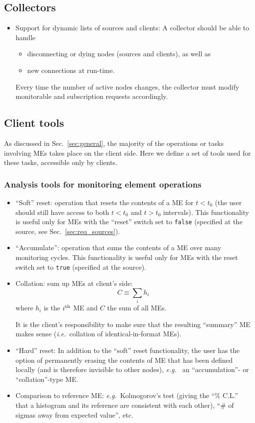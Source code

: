 \documentclass{cmspaper}
\newcommand {\ie}{\mbox{\sl i.e. }}     %
\newcommand {\eg}{\mbox{\sl e.g. }}     %
\begin{document}
\subsection{Collectors}
\label{sec:req_collectors}
\begin{itemize}
\item{Support for dynamic lists of sources and clients: A collector
should be able to handle 
\begin{itemize}
\item{disconnecting or dying nodes (sources and
clients), as well as}
\item{new connections at run-time.}
\end{itemize}
Every time the number of active nodes changes, the collector must
modify monitorable and subscription requests accordingly.}
\end{itemize}
%
%
\subsection{Client tools}
\label{sec:tools}
%
As discussed in Sec.~\ref{sec:general}, the majority of the operations
or tasks involving MEs takes place on the client side. Here we define
a set of tools used for these tasks, accessible only by clients.
%
\subsubsection{Analysis tools for monitoring element operations}
\label{sec:analysis_tools}
%
\begin{itemize}
\item{``Soft'' reset: operation that resets the contents of a ME 
for $t < t_0$ (the user should still have access to both $t < t_0$ and
$t > t_0$ intervals). This functionality is useful only for MEs
with the ``reset'' switch set to {\tt false} (specified at the source, see
Sec.~\ref{sec:req_sources}).}

\item{``Accumulate'': operation that sums the contents of a ME
 over many monitoring cycles. This functionality is useful only
for MEs with the reset switch set to {\tt true} (specified at
the source)}.

\item{Collation: sum up MEs at client's side: 
$$C \equiv \sum_i h_i $$
where $h_i$ is the $i^{\rm th}$ ME and $C$ the sum of all MEs.

It is the client's responsibility to make sure that the resulting ``summary''
ME makes sense (\ie collation of identical-in-format
MEs).}

\item{``Hard'' reset: In addition to the ``soft'' reset functionality, the
user has the option of permanently erasing the contents of ME that has
been defined locally (and is therefore invisible to other nodes), \eg
an ``accumulation''- or ``collation''-type ME.}

\item{Comparison to reference ME: \eg Kolmogorov's test (giving the ``\% C.L.''
that a histogram and its reference are consistent with each other),
``\# of sigmas away from expected value'', etc.}

\end{itemize}
%
%
\end{document}
